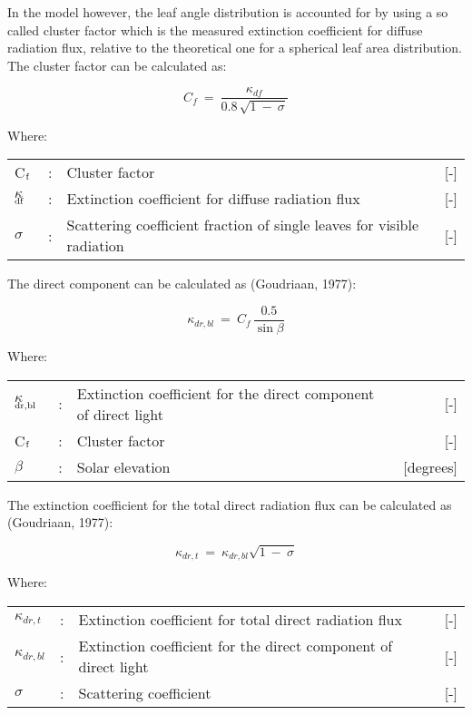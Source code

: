 In the model however, the leaf angle distribution is accounted for by using a so called
cluster factor which is the measured extinction coefficient for diffuse radiation flux,
relative to the theoretical one for a spherical leaf area distribution. The cluster factor can
be calculated as: 

\begin{equation}
\label{eq:5.16}
C _{f} ~=~{\frac{ \kappa _{df} }{0.8\, \sqrt{1 ~-~ \sigma } }}
\end{equation}

Where:\\[5pt]
\begin{tabularx}{\textwidth}{llXr}
	C$_{{\rm f}}$ &:& Cluster factor    &    [-]\\
	$\kappa$$_{{\rm df}}$ &:& Extinction coefficient for diffuse radiation flux   &     [-]\\
	$\sigma$ &:& Scattering coefficient fraction of single leaves for
	visible radiation  &      [-]\\
\end{tabularx}

The direct component can be calculated as (Goudriaan, 1977):

\begin{equation}
\label{eq:5.17}
\kappa _{dr,bl} ~=~{ C _{f} }\,{\frac{0.5}{\sin \beta }}
\end{equation}

Where:\\[5pt]
\begin{tabularx}{\textwidth}{llXr}
	$\kappa$$_{{\rm dr,bl}}$ &:& Extinction coefficient for the direct component of direct light   &     [-] \\
	C$_{{\rm f}}$ &:& Cluster factor     &   [-]\\
	$\beta$ &:& Solar elevation     &   [degrees]\\
\end{tabularx}

The extinction coefficient for the total direct radiation flux can be calculated as (Goudriaan, 1977):

\begin{equation}
\label{eq:5.18}
\kappa _{dr,t} ~=~ \kappa _{dr,bl} \sqrt{1~-~\sigma }
\end{equation}

Where:\\[5pt]
\begin{tabularx}{\textwidth}{llXr}
	$\kappa_{dr,t}$ &:& Extinction coefficient for total direct radiation flux   &    [-]\\
	$\kappa_{dr,bl}$ &:& Extinction coefficient for the direct component of direct light  &   [-]\\
	$\sigma$ &:& Scattering coefficient     &    [-]\\
\end{tabularx}


